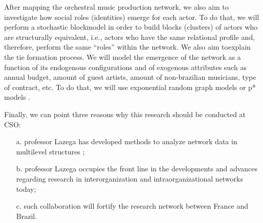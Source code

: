 \documentclass[a4paper, 12pt, openright, oneside, german, french, brazil, english, article]{abntex2}
\begin{document}
	After mapping the orchestral music production network, we also aim to investigate how social roles (identities) emerge for each actor. To do that, we will perform a stochastic blockmodel in order to build blocks (clusters) of actors who are structurally equivalent, i.e., actors who have the same relational profile and, therefore, perform the same ``roles'' within the network. We also aim toexplain the tie formation process. We will model the emergence of the network as a function of its endogenous configurations and of exogenous attributes such as annual budget, amount of guest artists, amount of non-brazilian musicians, type of contract, etc. To do that, we will use exponential random graph models or p* models \cite{lazega2014redes}.
	
	Finally, we can point three reasons why this research should be conducted at CSO:
	
	\begin{enumerate}
		\item[a.] professor Lazega has developed methods to analyze network data in multilevel structures \cite{lazega2016multilevel};
		\item[b.] professor Lazega occupies the front line in the developments and advances regarding research in interorganization and intraorganizational networks today;
		\item[c.] such collaboration will fortify the research network between France and Brazil.
	\end{enumerate}
	
	
	
	
	
	
	
	
	
	
\postextual
{}

\end{document}
